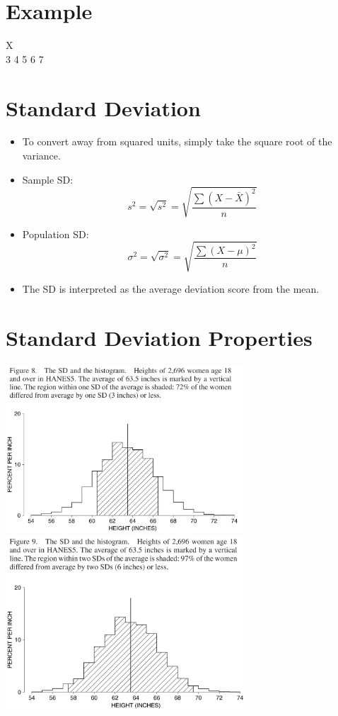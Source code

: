 \documentclass[12pt]{article}
\begin{document}
\section{Example}\label{example}

X\\3 4 5 6 7

\section{Standard Deviation}\label{standard-deviation}

\begin{itemize}
\itemsep1pt\parskip0pt
\item
  To convert away from squared units, simply take the square root of the
  variance.
\item
  Sample SD:
  \[ s^2 = \sqrt{s^2} = \sqrt{\frac{\sum (X - \bar{X})^2}{n}} \]
\item
  Population SD:
  \[ \sigma^2 = \sqrt{\sigma^2} = \sqrt{\frac{\sum (X - \mu)^2}{n}} \]
\item
  The SD is interpreted as the average deviation score from the mean.
\end{itemize}

\section{Standard Deviation
Properties}\label{standard-deviation-properties}

\includegraphics[width=3.5in]{sd_norm.png} \includegraphics[width=3.5in]{sd_norm2.png}
\end{document}
